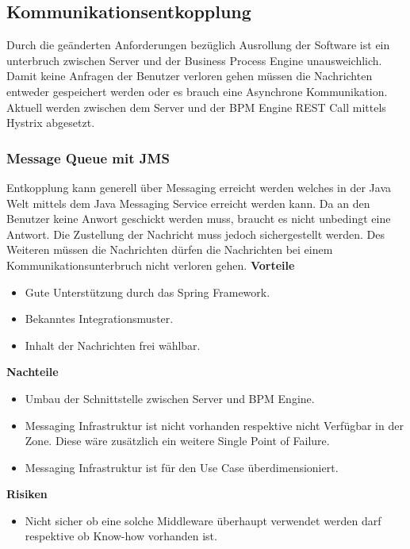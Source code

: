 \subsection{Kommunikationsentkopplung}

Durch die geänderten Anforderungen bezüglich Ausrollung der Software ist ein unterbruch zwischen Server und der Business Process Engine unausweichlich. Damit keine Anfragen der Benutzer verloren gehen müssen die Nachrichten entweder gespeichert werden oder es brauch eine Asynchrone Kommunikation. Aktuell werden zwischen dem Server und der BPM Engine REST Call mittels Hystrix abgesetzt.

\subsubsection{Message Queue mit JMS}

Entkopplung kann generell über Messaging erreicht werden welches in der Java Welt mittels dem Java Messaging Service erreicht werden kann. Da an den Benutzer keine Anwort geschickt werden muss,
braucht es nicht unbedingt eine Antwort. Die Zustellung der Nachricht muss jedoch sichergestellt werden. Des Weiteren müssen die Nachrichten dürfen die Nachrichten bei einem Kommunikationsunterbruch nicht verloren gehen.
\newline
\newline
\textbf{Vorteile}
\begin{itemize}
	\item Gute Unterstützung durch das Spring Framework.
	\item Bekanntes Integrationsmuster.
	\item Inhalt der Nachrichten frei wählbar.
\end{itemize}
\textbf{Nachteile}
\begin{itemize}
	\item Umbau der Schnittstelle zwischen Server und BPM Engine.
	\item Messaging Infrastruktur ist nicht vorhanden respektive nicht Verfügbar in der Zone. Diese wäre zusätzlich ein weitere Single Point of Failure.
	\item Messaging Infrastruktur ist für den Use Case überdimensioniert.
\end{itemize}
\textbf{Risiken}
\begin{itemize}
	\item Nicht sicher ob eine solche Middleware überhaupt verwendet werden darf respektive ob Know-how vorhanden ist.
\end{itemize}

